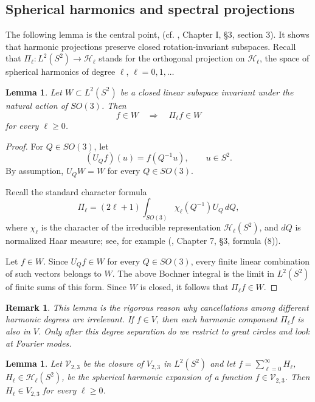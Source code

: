 \documentclass[11pt]{article}
\newtheorem{lemma}[theorem]{Lemma}
\newtheorem{remark}[theorem]{Remark}
\theoremstyle{definition}
\newcommand{\HH}{\mathcal H}
\begin{document}
\subsection{Spherical harmonics and spectral projections}


The following lemma is the central point, (cf. \cite{V}, Chapter I,  \S 3, section 3). It shows that harmonic projections preserve closed rotation-invariant subspaces. Recall that
$
\Pi_\ell:L^2(S^2)\to \mathcal H_\ell
$
stands for  the orthogonal projection on $\HH_\ell$, the space of spherical harmonics of degree $\ell$, $\ell=0,1,\dots$

\begin{lemma}\label{l1OO1}
Let \(W\subset L^2(S^2)\) be a closed linear subspace invariant under the natural action of
\(SO(3)\). Then
\[
f\in W \quad\Longrightarrow\quad \Pi_\ell f\in W
\]
for every \(\ell\ge0\).
\end{lemma}

\begin{proof}
For \(Q\in SO(3)\), let
\[
(U_Qf)(u)=f(Q^{-1}u),\qquad u\in S^2.
\]
By assumption, \(U_QW=W\) for every \(Q\in SO(3)\).

Recall the standard character formula
\[
\Pi_\ell
=(2\ell+1)\int_{SO(3)}\chi_\ell(Q^{-1})U_Q\,dQ,
\]
where \(\chi_\ell\) is the character of the irreducible representation
\(\mathcal H_\ell(S^2)\), and \(dQ\) is normalized Haar measure; see, for example (\cite{BR}, Chapter 7, \S 3, formula (8)).


Let \(f\in W\). Since \(U_Qf\in W\) for every \(Q\in SO(3)\), every finite
linear combination of such vectors belongs to \(W\). The above Bochner integral is the
limit in \(L^2(S^2)\) of finite sums of this form. Since \(W\) is closed, it follows that
\(\Pi_\ell f\in W\).
\end{proof}

\begin{remark}
	This lemma is the rigorous reason why cancellations among different harmonic degrees are
	irrelevant. If \(f\in V\), then each harmonic component \(\Pi_\ell f\) is also in \(V\).
	Only after this degree separation do we restrict to great circles and look at Fourier modes.
\end{remark}



\begin{lemma}\label{harmoniccomponent}
	Let
	$
	{\mathcal V}_{2,3}$ be the closure of
	$V_{2,3}
	$ in $L^2(S^2)$
	and let
	$
	f=\sum_{\ell=0}^{\infty}H_\ell$,
	$
	H_\ell\in\mathcal H_\ell(S^2)$,
	be the spherical harmonic expansion of a function
	\(f\in{\mathcal V}_{2,3}\).
	Then
	$
	H_\ell\in V_{2,3}
	$
	for every \(\ell\ge0\).
\end{lemma}
\end{document}
